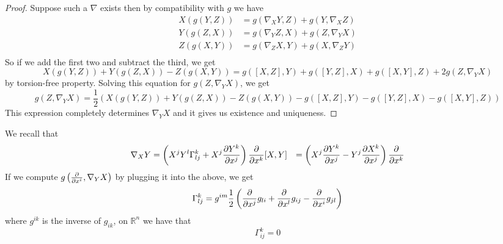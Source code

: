 \documentclass[a4paper]{article}
\begin{document}
\begin{proof}
  Suppose such a $\nabla$ exists then by compatibility with $g$ we have 
  \[
    \begin{aligned}
      X \left( g \left( Y, Z \right) \right) &= g \left( \nabla_X Y, Z \right) + g \left( Y, \nabla_X Z \right) \\
      Y \left( g \left( Z, X \right) \right) &= g \left( \nabla_Y Z, X \right) + g \left( Z, \nabla_Y X \right) \\
      Z \left( g \left( X, Y \right) \right) &= g \left( \nabla_Z X, Y \right) + g \left( X, \nabla_Z Y \right) \\
    \end{aligned}
  \]
  So if we add the first two and subtract the third, we get
  \[
    X(g(Y,Z)) + Y(g(Z,X)) - Z(g(X,Y)) = g([X,Z], Y) + g([Y,Z], X) + g([X,Y],Z) + 2 g (Z, \nabla_Y X)
  \]
  by torsion-free property. Solving this equation for $g(Z, \nabla_Y X)$, we get 
  \[
    g(Z, \nabla_Y X) = \frac{1}{2}  \left( X(g(Y,Z)) + Y(g(Z,X)) - Z(g(X,Y)) - g([X,Z], Y) - g([Y,Z], X) - g([X,Y], Z) \right) 
  \]
  This expression completely determines $\nabla_Y X$ and it gives us existence and uniqueness.
\end{proof}
We recall that
\[
  \begin{aligned}
    \nabla_X Y &= \left(X^jY^l \Gamma_{lj}^k + X^j \pdv{Y^k}{x^j}\right) \pdv{x^k}
    [X,Y] &= \left( X^j \pdv{Y^k}{x^j} - Y^j \pdv{X^k}{x^j} \right) \pdv{x^k}
  \end{aligned}
\]
If we compute $g \left( \pdv{x^i}, \nabla_Y X \right)$ by plugging it into the above, we get
\[
  \Gamma_{lj}^k = g^{im} \frac{1}{2} \left( \pdv{x^j}g_{li} + \pdv{x^l}g_{ij} - \pdv{x^i}g_{jl} \right)
\]
where $g^{ik}$ is the inverse of $g_{ik}$, on $\mathds{R}^n$ we have that
\[
  \Gamma_{ij}^k = 0
\]
\end{document}
